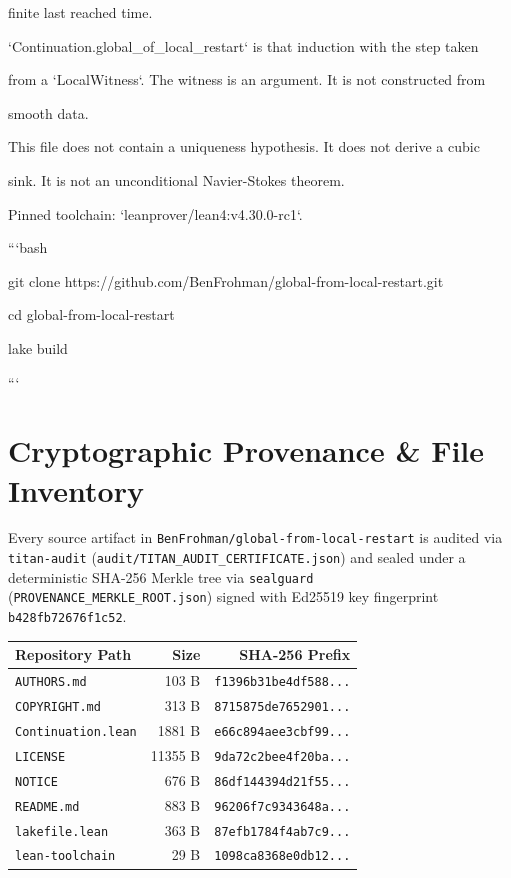 \documentclass[11pt,a4paper]{article}
\begin{document}
finite last reached time.

`Continuation.global\_of\_local\_restart` is that induction with the step taken

from a `LocalWitness`. The witness is an argument. It is not constructed from

smooth data.

This file does not contain a uniqueness hypothesis. It does not derive a cubic

sink. It is not an unconditional Navier-Stokes theorem.

Pinned toolchain: `leanprover/lean4:v4.30.0-rc1`.

```bash

git clone https://github.com/BenFrohman/global-from-local-restart.git

cd global-from-local-restart

lake build

```

\section{Cryptographic Provenance \& File Inventory}
Every source artifact in \texttt{BenFrohman/global-from-local-restart} is audited via \texttt{titan-audit}
(\texttt{audit/TITAN\_AUDIT\_CERTIFICATE.json}) and sealed under a deterministic SHA-256 Merkle tree via
\texttt{sealguard} (\texttt{PROVENANCE\_MERKLE\_ROOT.json}) signed with Ed25519 key fingerprint
\texttt{b428fb72676f1c52}.

\begin{center}
\small
\begin{tabular}{p{}rr}
\toprule
\textbf{Repository Path} & \textbf{Size} & \textbf{SHA-256 Prefix} \\
\midrule
\texttt{AUTHORS.md} & 103 B & \texttt{f1396b31be4df588...} \\
\texttt{COPYRIGHT.md} & 313 B & \texttt{8715875de7652901...} \\
\texttt{Continuation.lean} & 1881 B & \texttt{e66c894aee3cbf99...} \\
\texttt{LICENSE} & 11355 B & \texttt{9da72c2bee4f20ba...} \\
\texttt{NOTICE} & 676 B & \texttt{86df144394d21f55...} \\
\texttt{README.md} & 883 B & \texttt{96206f7c9343648a...} \\
\texttt{lakefile.lean} & 363 B & \texttt{87efb1784f4ab7c9...} \\
\texttt{lean-toolchain} & 29 B & \texttt{1098ca8368e0db12...} \\
\bottomrule
\end{tabular}
\end{center}
\end{document}
